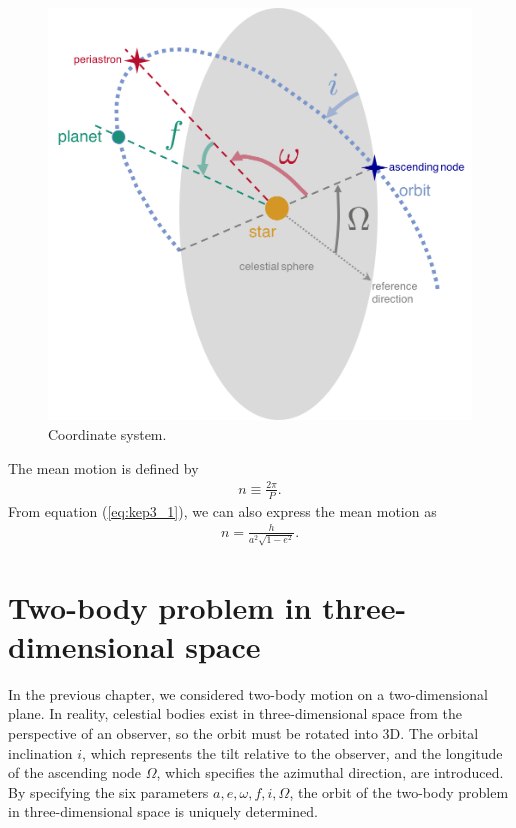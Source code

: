 \begin{figure}[]
 \begin{center}
 \includegraphics[bb=0 0 474 461,width=1.0\linewidth]{fig/orbele.png}
\end{center}
	\caption{Coordinate system.}
	\label{fig:ellip}
\end{figure} 

The mean motion is defined by
\begin{align}
    n \equiv \frac{2 \pi}{P}.
\end{align}
From equation (\ref{eq:kep3_1}), we can also express the mean motion as
\begin{align}
\label{eq:mean_motion}
    n = \frac{h}{a^2 \sqrt{1-e^2}}.
\end{align}


\section{Two-body problem in three-dimensional space \label{ss:threedtwobody}}

In the previous chapter, we considered two-body motion on a two-dimensional plane. In reality, celestial bodies exist in three-dimensional space from the perspective of an observer, so the orbit must be rotated into 3D. The orbital inclination $i$, which represents the tilt relative to the observer, and the longitude of the ascending node $\Omega$, which specifies the azimuthal direction, are introduced. By specifying the six parameters $a, e, \omega, f, i, \Omega$, the orbit of the two-body problem in three-dimensional space is uniquely determined.

